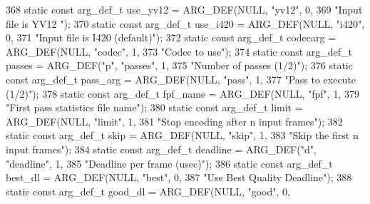 \begin{DoxyCodeInclude}
{{368 \textcolor{keyword}{static} \textcolor{keyword}{const} arg\_def\_t use\_yv12 = ARG\_DEF(NULL, \textcolor{stringliteral}{"yv12"}, 0,
369                                           \textcolor{stringliteral}{"Input file is YV12 "});
370 \textcolor{keyword}{static} \textcolor{keyword}{const} arg\_def\_t use\_i420 = ARG\_DEF(NULL, \textcolor{stringliteral}{"i420"}, 0,
371                                           \textcolor{stringliteral}{"Input file is I420 (default)"});
372 \textcolor{keyword}{static} \textcolor{keyword}{const} arg\_def\_t codecarg = ARG\_DEF(NULL, \textcolor{stringliteral}{"codec"}, 1,
373                                           \textcolor{stringliteral}{"Codec to use"});
374 \textcolor{keyword}{static} \textcolor{keyword}{const} arg\_def\_t passes           = ARG\_DEF(\textcolor{stringliteral}{"p"}, \textcolor{stringliteral}{"passes"}, 1,
375                                                   \textcolor{stringliteral}{"Number of passes (1/2)"});
376 \textcolor{keyword}{static} \textcolor{keyword}{const} arg\_def\_t pass\_arg         = ARG\_DEF(NULL, \textcolor{stringliteral}{"pass"}, 1,
377                                                   \textcolor{stringliteral}{"Pass to execute (1/2)"});
378 \textcolor{keyword}{static} \textcolor{keyword}{const} arg\_def\_t fpf\_name         = ARG\_DEF(NULL, \textcolor{stringliteral}{"fpf"}, 1,
379                                                   \textcolor{stringliteral}{"First pass statistics file name"});
380 \textcolor{keyword}{static} \textcolor{keyword}{const} arg\_def\_t limit = ARG\_DEF(NULL, \textcolor{stringliteral}{"limit"}, 1,
381                                        \textcolor{stringliteral}{"Stop encoding after n input frames"});
382 \textcolor{keyword}{static} \textcolor{keyword}{const} arg\_def\_t skip = ARG\_DEF(NULL, \textcolor{stringliteral}{"skip"}, 1,
383                                       \textcolor{stringliteral}{"Skip the first n input frames"});
384 \textcolor{keyword}{static} \textcolor{keyword}{const} arg\_def\_t deadline         = ARG\_DEF(\textcolor{stringliteral}{"d"}, \textcolor{stringliteral}{"deadline"}, 1,
385                                                   \textcolor{stringliteral}{"Deadline per frame (usec)"});
386 \textcolor{keyword}{static} \textcolor{keyword}{const} arg\_def\_t best\_dl          = ARG\_DEF(NULL, \textcolor{stringliteral}{"best"}, 0,
387                                                   \textcolor{stringliteral}{"Use Best Quality Deadline"});
388 \textcolor{keyword}{static} \textcolor{keyword}{const} arg\_def\_t good\_dl          = ARG\_DEF(NULL, \textcolor{stringliteral}{"good"}, 0,
}}
\end{DoxyCodeInclude}
